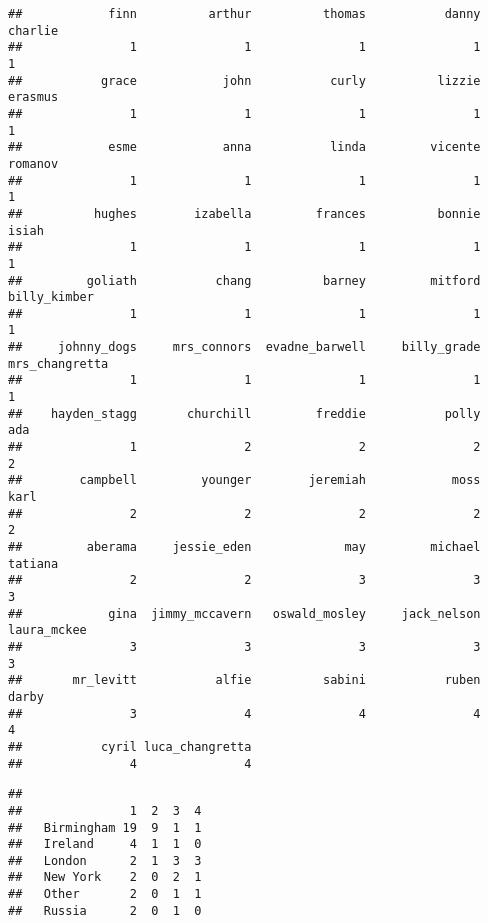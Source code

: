 \documentclass[
]{article}
\newenvironment{Shaded}{\begin{snugshade}}{\end{snugshade}}
\newcommand{\FunctionTok}[1]{\textcolor[rgb]{0.13,0.29,0.53}{\textbf{#1}}}
\newcommand{\NormalTok}[1]{#1}
\newcommand{\SpecialCharTok}[1]{\textcolor[rgb]{0.81,0.36,0.00}{\textbf{#1}}}
\begin{document}
\begin{verbatim}
##            finn          arthur          thomas           danny         charlie 
##               1               1               1               1               1 
##           grace            john           curly          lizzie         erasmus 
##               1               1               1               1               1 
##            esme            anna           linda         vicente         romanov 
##               1               1               1               1               1 
##          hughes        izabella         frances          bonnie           isiah 
##               1               1               1               1               1 
##         goliath           chang          barney         mitford    billy_kimber 
##               1               1               1               1               1 
##     johnny_dogs     mrs_connors  evadne_barwell     billy_grade  mrs_changretta 
##               1               1               1               1               1 
##    hayden_stagg       churchill         freddie           polly             ada 
##               1               2               2               2               2 
##        campbell         younger        jeremiah            moss            karl 
##               2               2               2               2               2 
##         aberama     jessie_eden             may         michael         tatiana 
##               2               2               3               3               3 
##            gina  jimmy_mccavern   oswald_mosley     jack_nelson     laura_mckee 
##               3               3               3               3               3 
##       mr_levitt           alfie          sabini           ruben           darby 
##               3               4               4               4               4 
##           cyril luca_changretta 
##               4               4
\end{verbatim}

\begin{Shaded}
\end{Shaded}

\begin{verbatim}
##             
##               1  2  3  4
##   Birmingham 19  9  1  1
##   Ireland     4  1  1  0
##   London      2  1  3  3
##   New York    2  0  2  1
##   Other       2  0  1  1
##   Russia      2  0  1  0
\end{verbatim}
\end{document}
